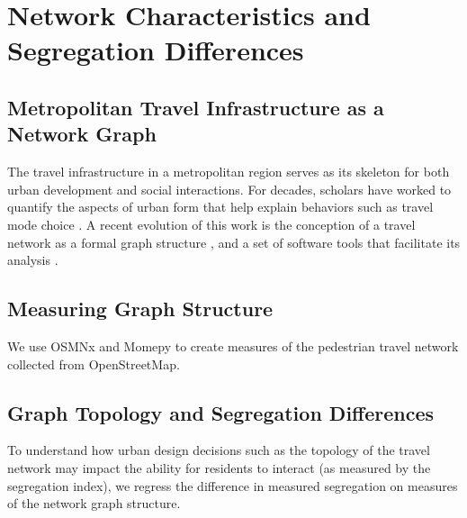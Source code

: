 \documentclass[
  10pt,
]{article}
\begin{document}
\hypertarget{network-characteristics-and-segregation-differences}{%
\section{Network Characteristics and Segregation
Differences}\label{network-characteristics-and-segregation-differences}}

\hypertarget{metropolitan-travel-infrastructure-as-a-network-graph}{%
\subsection{Metropolitan Travel Infrastructure as a Network
Graph}\label{metropolitan-travel-infrastructure-as-a-network-graph}}

The travel infrastructure in a metropolitan region serves as its
skeleton for both urban development and social interactions. For
decades, scholars have worked to quantify the aspects of urban form that
help explain behaviors such as travel mode choice
\citep[\citet{ewing2010TravelBuilt}]{crane2000InfluenceUrban, clifton2008QuantitativeAnalysis, ewing2009MeasuringUnmeasurable}.
A recent evolution of this work is the conception of a travel network as
a formal graph structure
\citep{boeing2018PlanarityStreet, boeing2018MorphologyCircuity, fleischmann2021MethodologicalFoundation, fleischmann2018MeasuringUrban},
and a set of software tools that facilitate its analysis
\citep{boeing2016OSMnxNew, fleischmann2019MomepyUrban}.

\hypertarget{measuring-graph-structure}{%
\subsection{Measuring Graph Structure}\label{measuring-graph-structure}}

We use OSMNx and Momepy to create measures of the pedestrian travel
network collected from OpenStreetMap.

\hypertarget{graph-topology-and-segregation-differences}{%
\subsection{Graph Topology and Segregation
Differences}\label{graph-topology-and-segregation-differences}}

To understand how urban design decisions such as the topology of the
travel network may impact the ability for residents to interact (as
measured by the segregation index), we regress the difference in
measured segregation on measures of the network graph structure.
\end{document}
